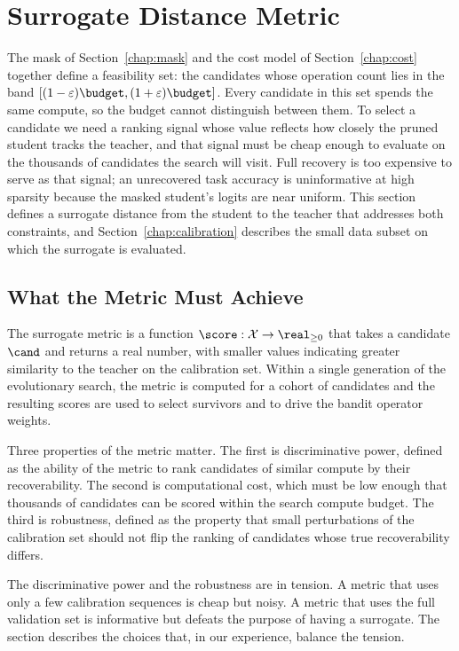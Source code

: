 \section{Surrogate Distance Metric}
\label{chap:metric}

The mask of Section~\ref{chap:mask} and the cost model of Section~\ref{chap:cost} together define a feasibility set: the candidates whose operation count lies in the band $[(1 - \varepsilon)\budget, (1 + \varepsilon)\budget]$. Every candidate in this set spends the same compute, so the budget cannot distinguish between them. To select a candidate we need a ranking signal whose value reflects how closely the pruned student tracks the teacher, and that signal must be cheap enough to evaluate on the thousands of candidates the search will visit. Full recovery is too expensive to serve as that signal; an unrecovered task accuracy is uninformative at high sparsity because the masked student's logits are near uniform. This section defines a surrogate distance from the student to the teacher that addresses both constraints, and Section~\ref{chap:calibration} describes the small data subset on which the surrogate is evaluated.

\subsection{What the Metric Must Achieve}

The surrogate metric is a function $\score : \mathcal{X} \to \real_{\ge 0}$ that takes a candidate $\cand$ and returns a real number, with smaller values indicating greater similarity to the teacher on the calibration set. Within a single generation of the evolutionary search, the metric is computed for a cohort of candidates and the resulting scores are used to select survivors and to drive the bandit operator weights.

Three properties of the metric matter. The first is discriminative power, defined as the ability of the metric to rank candidates of similar compute by their recoverability. The second is computational cost, which must be low enough that thousands of candidates can be scored within the search compute budget. The third is robustness, defined as the property that small perturbations of the calibration set should not flip the ranking of candidates whose true recoverability differs.

The discriminative power and the robustness are in tension. A metric that uses only a few calibration sequences is cheap but noisy. A metric that uses the full validation set is informative but defeats the purpose of having a surrogate. The section describes the choices that, in our experience, balance the tension.

